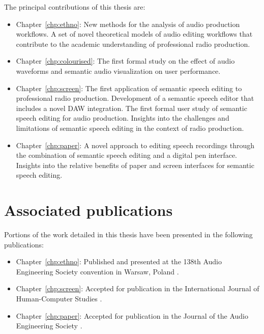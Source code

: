 The principal contributions of this thesis are:
\begin{itemize}
  \item Chapter~\ref{chp:ethno}: 
    New methods for the analysis of audio production workflows. A set of novel theoretical models of audio editing
    workflows that contribute to the academic understanding of professional radio production.
  \item Chapter~\ref{chp:colourised}: 
    The first formal study on the effect of audio waveforms and semantic audio visualization on user performance.
  \item Chapter~\ref{chp:screen}: 
    The first application of semantic speech editing to professional radio production. Development of a semantic speech
    editor that includes a novel DAW integration. The first formal user study of semantic speech editing for audio
    production. Insights into the challenges and limitations of semantic speech editing in the context of radio
    production. 
  \item Chapter~\ref{chp:paper}:
    A novel approach to editing speech recordings through the combination of semantic speech editing and a digital pen
    interface. Insights into the relative benefits of paper and screen interfaces for semantic speech editing.
\end{itemize}

\section{Associated publications}\label{sec:intro-publications}

Portions of the work detailed in this thesis have been presented in the following publications:


\begin{itemize}
  \item Chapter~\ref{chp:ethno}: Published and presented at the 138th Audio Engineering Society convention in Warsaw,
    Poland \citep{Baume2015}.
  \item Chapter~\ref{chp:screen}: Accepted for publication in the International Journal of Human-Computer Studies
    \citep{Baume2018a}.
  \item Chapter~\ref{chp:paper}: Accepted for publication in the Journal of the Audio Engineering Society
    \citep{Baume2018}.
\end{itemize}

